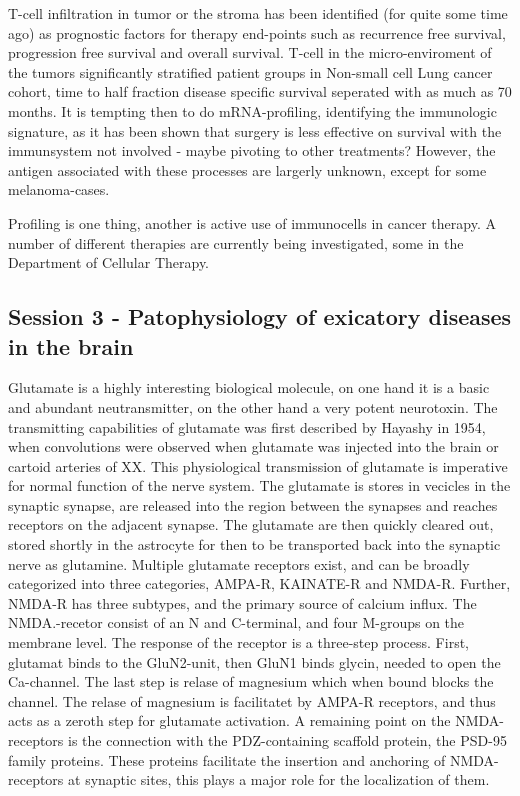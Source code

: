 \documentclass[12p]{article}
\begin{document}
T-cell infiltration in tumor or the stroma has been identified (for quite some time ago) as prognostic factors for therapy end-points such as recurrence free survival, progression free survival and overall survival.
T-cell in the micro-enviroment of the tumors significantly stratified patient groups in Non-small cell Lung cancer cohort, time to half fraction disease specific survival seperated with as much as 70 months.
It is tempting then to do mRNA-profiling, identifying the immunologic signature, as it has been shown that surgery is less effective on survival with the immunsystem not involved - maybe pivoting to other treatments?
However, the antigen associated with these processes are largerly unknown, except for some melanoma-cases.

Profiling is one thing, another is active use of immunocells in cancer therapy.
A number of different therapies are currently being investigated, some in the Department of Cellular Therapy.

\subsection*{Session 3 - Patophysiology of exicatory diseases in the brain}

Glutamate is a highly interesting biological molecule, on one hand it is a basic and abundant neutransmitter, on the other hand a very potent neurotoxin.
The transmitting capabilities of glutamate was first described by Hayashy in 1954, when convolutions were observed when glutamate was injected into the brain or cartoid arteries of XX.
This physiological transmission of glutamate is imperative for normal function of the nerve system.
The glutamate is stores in vecicles in the synaptic synapse, are released into the region between the synapses and reaches receptors on the adjacent synapse.
The glutamate are then quickly cleared out, stored shortly in the astrocyte for then to be transported back into the synaptic nerve as glutamine.
Multiple glutamate receptors exist, and can be broadly categorized into three categories, AMPA-R, KAINATE-R and NMDA-R.
Further, NMDA-R has three subtypes, and the primary source of calcium influx.
The NMDA.-recetor consist of an N and C-terminal, and four M-groups on the membrane level.
The response of the receptor is a three-step process.
First, glutamat binds to the GluN2-unit, then GluN1 binds glycin, needed to open the Ca-channel.
The last step is relase of magnesium which when bound blocks the channel.
The relase of magnesium is facilitatet by AMPA-R receptors, and thus acts as a zeroth step for glutamate activation.
A remaining point on the NMDA-receptors is the connection with the PDZ-containing scaffold protein, the PSD-95 family proteins.
These proteins facilitate the insertion and anchoring of NMDA-receptors at synaptic sites, this plays a major role for the localization of them.
\end{document}
